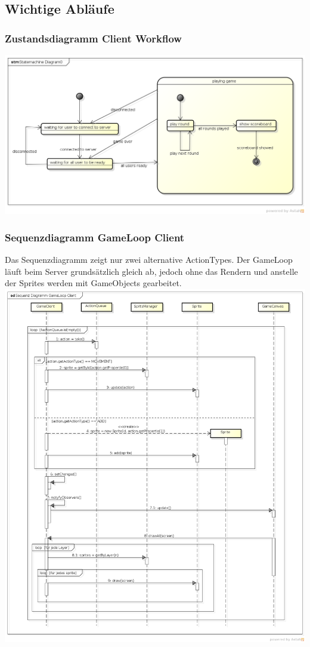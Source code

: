 \documentclass[11pt]{scrartcl}
\begin{document}
\newpage

\subsection{Wichtige Abläufe}
\subsubsection{Zustandsdiagramm Client Workflow}
\includegraphics[scale=0.43]{StatemachineClient}

\newpage

\subsubsection{Sequenzdiagramm GameLoop Client}
Das Sequenzdiagramm zeigt nur zwei alternative ActionTypes. Der GameLoop läuft beim Server grundsätzlich gleich ab, jedoch ohne das Rendern und anstelle der Sprites werden mit GameObjects gearbeitet.\\

\includegraphics[scale=0.39]{SequenzDiagrammGameLoopClient}
\end{document}
